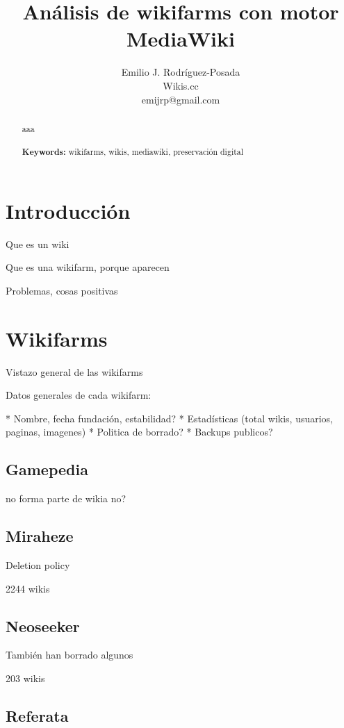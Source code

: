 \documentclass[14pt,twocolumn]{article}
\title{Análisis de wikifarms con motor MediaWiki}
\author{Emilio J. Rodríguez-Posada \\ Wikis.cc \\ emijrp@gmail.com}
\begin{document}
	
\maketitle

\begin{abstract}

aaa
\\
\\
\textbf{Keywords:} wikifarms, wikis, mediawiki, preservación digital

\end{abstract}

\section{Introducción}

Que es un wiki

Que es una wikifarm, porque aparecen

Problemas, cosas positivas

\section{Wikifarms}

Vistazo general de las wikifarms

Datos generales de cada wikifarm:

* Nombre, fecha fundación, estabilidad?
* Estadísticas (total wikis, usuarios, paginas, imagenes)
* Politica de borrado?
* Backups publicos?

\subsection{Gamepedia}

no forma parte de wikia no?

\subsection{Miraheze}

Deletion policy

2244 wikis

\subsection{Neoseeker}

También han borrado algunos

203 wikis

\subsection{Referata}
\end{document}
